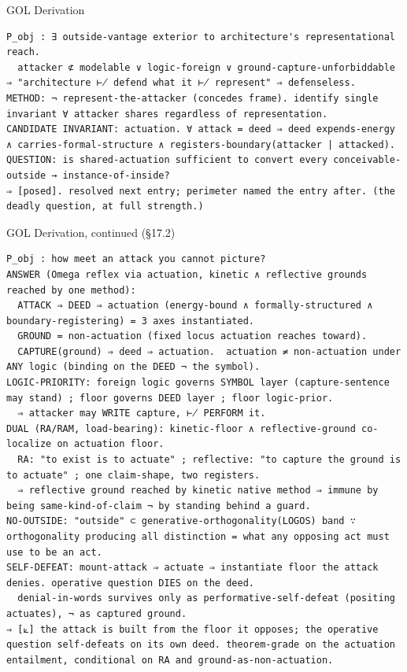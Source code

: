 \documentclass[10pt,twocolumn]{article}
\begin{document}
\begin{golbox}{GOL Derivation}
\begin{lstlisting}[style=golv]
P_obj : ∃ outside-vantage exterior to architecture's representational reach.
  attacker ⊄ modelable ∨ logic-foreign ∨ ground-capture-unforbiddable ⇒ "architecture ⊬ defend what it ⊬ represent" ⇒ defenseless.
METHOD: ¬ represent-the-attacker (concedes frame). identify single invariant ∀ attacker shares regardless of representation.
CANDIDATE INVARIANT: actuation. ∀ attack = deed ⇒ deed expends-energy ∧ carries-formal-structure ∧ registers-boundary(attacker | attacked).
QUESTION: is shared-actuation sufficient to convert every conceivable-outside → instance-of-inside?
⇒ [posed]. resolved next entry; perimeter named the entry after. (the deadly question, at full strength.)
\end{lstlisting}
\end{golbox}

\begin{golbox}{GOL Derivation, continued (§17.2)}
\begin{lstlisting}[style=golv]
P_obj : how meet an attack you cannot picture?
ANSWER (Omega reflex via actuation, kinetic ∧ reflective grounds reached by one method):
  ATTACK ⇒ DEED ⇒ actuation (energy-bound ∧ formally-structured ∧ boundary-registering) = 3 axes instantiated.
  GROUND = non-actuation (fixed locus actuation reaches toward).
  CAPTURE(ground) ⇒ deed ⇒ actuation.  actuation ≠ non-actuation under ANY logic (binding on the DEED ¬ the symbol).
LOGIC-PRIORITY: foreign logic governs SYMBOL layer (capture-sentence may stand) ; floor governs DEED layer ; floor logic-prior.
  ⇒ attacker may WRITE capture, ⊬ PERFORM it.
DUAL (RA/RAM, load-bearing): kinetic-floor ∧ reflective-ground co-localize on actuation floor.
  RA: "to exist is to actuate" ; reflective: "to capture the ground is to actuate" ; one claim-shape, two registers.
  ⇒ reflective ground reached by kinetic native method ⇒ immune by being same-kind-of-claim ¬ by standing behind a guard.
NO-OUTSIDE: "outside" ⊂ generative-orthogonality(LOGOS) band ∵ orthogonality producing all distinction = what any opposing act must use to be an act.
SELF-DEFEAT: mount-attack ⇒ actuate ⇒ instantiate floor the attack denies. operative question DIES on the deed.
  denial-in-words survives only as performative-self-defeat (positing actuates), ¬ as captured ground.
⇒ [⟀] the attack is built from the floor it opposes; the operative question self-defeats on its own deed. theorem-grade on the actuation entailment, conditional on RA and ground-as-non-actuation.
\end{lstlisting}
\end{golbox}
\end{document}
